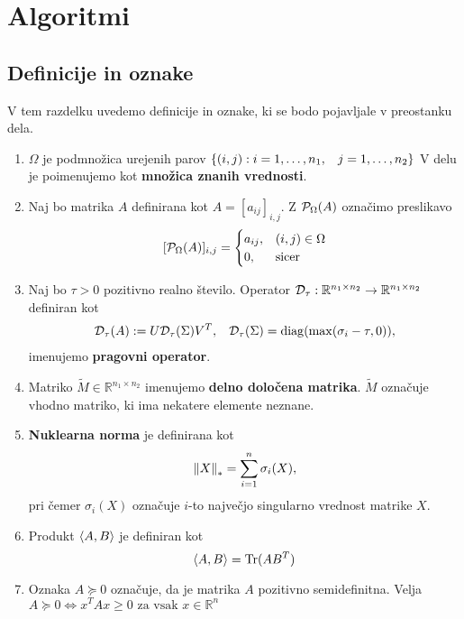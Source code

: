 \chapter{Algoritmi} \label{1407-1011}


\section{Definicije in oznake}
V tem razdelku uvedemo definicije in oznake, ki se bodo pojavljale v preostanku dela.
\begin{enumerate}
  \item $\Omega$ je podmnožica urejenih parov $\{ (i, j) : i = 1, \hdots , n_1, \hspace{0.3cm} j = 1, \hdots, n_2 \}$ V delu je poimenujemo kot \textbf{množica znanih vrednosti}.
  \item Naj bo matrika $A$ definirana kot $A = [a_{ij}]_{i,j}$. Z $\mathcal{P}_\Omega(A)$ označimo preslikavo 
        \[ [\mathcal{P}_\Omega(A)]_{i,j} = \begin{cases}
            a_{ij}, & (i, j) \in \Omega \\
            0,      & \text{sicer}
          \end{cases}
        \]
  \item Naj bo $\tau > 0$ pozitivno realno število. Operator $\mathcal{D}_\tau: \mathbb{R}^{n_1 \times n_2} \rightarrow \mathbb{R}^{n_1 \times n_2}$ definiran kot
        \begin{align}
          \label{1007-1959}
          \mathcal{D}_\tau(A) := U \mathcal{D}_\tau(\Sigma) V^T, \hspace{0.3cm} \mathcal{D}_\tau(\Sigma) = \operatorname{diag}(\max(\sigma_i - \tau, 0)),
        \end{align}
        imenujemo \textbf{pragovni operator}. \cite{CCS}
  \item Matriko $\tilde{M} \in \mathbb{R}^{n_1 \times n_2}$ imenujemo \textbf{delno določena matrika}. $\tilde{M}$ označuje vhodno matriko, ki ima nekatere elemente neznane.
  \item \textbf{Nuklearna norma} je definirana kot \[
          \left\lVert X\right\rVert_* = \sum_{i = 1}^{n} \sigma_i(X),
        \] pri čemer $\sigma_i(X)$ označuje $i$-to največjo singularno vrednost matrike $X$.
  \item Produkt $\langle A, B \rangle$ je definiran kot \[
          \langle A, B \rangle = \text{Tr}(AB^T)
        \]
  \item Oznaka $A \succeq 0$ označuje, da je matrika $A$ pozitivno semidefinitna. Velja $A \succeq 0 \iff x^TAx \ge 0 \text{ za vsak } x \in \mathbb{R}^n$

\end{enumerate}
